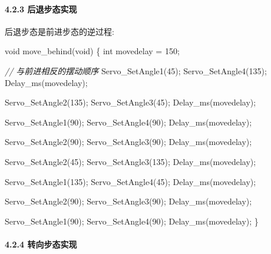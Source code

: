 \documentclass[
]{article}
\newenvironment{Shaded}{}{}
\newcommand{\CommentTok}[1]{\textcolor[rgb]{0.38,0.63,0.69}{\textit{#1}}}
\newcommand{\DataTypeTok}[1]{\textcolor[rgb]{0.56,0.13,0.00}{#1}}
\newcommand{\DecValTok}[1]{\textcolor[rgb]{0.25,0.63,0.44}{#1}}
\newcommand{\NormalTok}[1]{#1}
\begin{document}
\hypertarget{ux540eux9000ux6b65ux6001ux5b9eux73b0}{%
\paragraph{4.2.3
后退步态实现}\label{ux540eux9000ux6b65ux6001ux5b9eux73b0}}

后退步态是前进步态的逆过程:

\begin{Shaded}
\begin{Highlighting}[]
\DataTypeTok{void}\NormalTok{ move\_behind(}\DataTypeTok{void}\NormalTok{)}
\NormalTok{\{}
    \DataTypeTok{int}\NormalTok{ movedelay = }\DecValTok{150}\NormalTok{;}
    
    \CommentTok{// 与前进相反的摆动顺序}
\NormalTok{    Servo\_SetAngle1(}\DecValTok{45}\NormalTok{);}
\NormalTok{    Servo\_SetAngle4(}\DecValTok{135}\NormalTok{);}
\NormalTok{    Delay\_ms(movedelay);}
    
\NormalTok{    Servo\_SetAngle2(}\DecValTok{135}\NormalTok{);}
\NormalTok{    Servo\_SetAngle3(}\DecValTok{45}\NormalTok{);}
\NormalTok{    Delay\_ms(movedelay);}
    
\NormalTok{    Servo\_SetAngle1(}\DecValTok{90}\NormalTok{);}
\NormalTok{    Servo\_SetAngle4(}\DecValTok{90}\NormalTok{);}
\NormalTok{    Delay\_ms(movedelay);}
    
\NormalTok{    Servo\_SetAngle2(}\DecValTok{90}\NormalTok{);}
\NormalTok{    Servo\_SetAngle3(}\DecValTok{90}\NormalTok{);}
\NormalTok{    Delay\_ms(movedelay);}
    
\NormalTok{    Servo\_SetAngle2(}\DecValTok{45}\NormalTok{);}
\NormalTok{    Servo\_SetAngle3(}\DecValTok{135}\NormalTok{);}
\NormalTok{    Delay\_ms(movedelay);}
    
\NormalTok{    Servo\_SetAngle1(}\DecValTok{135}\NormalTok{);}
\NormalTok{    Servo\_SetAngle4(}\DecValTok{45}\NormalTok{);}
\NormalTok{    Delay\_ms(movedelay);}
    
\NormalTok{    Servo\_SetAngle2(}\DecValTok{90}\NormalTok{);}
\NormalTok{    Servo\_SetAngle3(}\DecValTok{90}\NormalTok{);}
\NormalTok{    Delay\_ms(movedelay);}
    
\NormalTok{    Servo\_SetAngle1(}\DecValTok{90}\NormalTok{);}
\NormalTok{    Servo\_SetAngle4(}\DecValTok{90}\NormalTok{);}
\NormalTok{    Delay\_ms(movedelay);}
\NormalTok{\}}
\end{Highlighting}
\end{Shaded}

\hypertarget{ux8f6cux5411ux6b65ux6001ux5b9eux73b0}{%
\paragraph{4.2.4
转向步态实现}\label{ux8f6cux5411ux6b65ux6001ux5b9eux73b0}}
\end{document}
